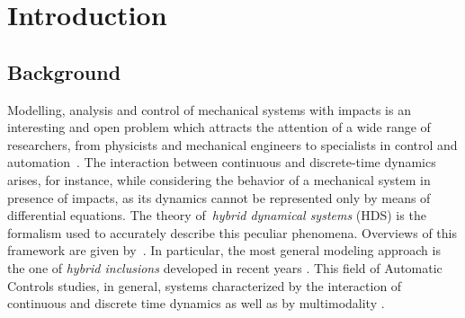 \chapter{{Introduction}}
\label{chap:introduction}
\minitoc

\thispagestyle{empty}

\newpage



\section{Background}

Modelling, analysis and control of mechanical systems with impacts is an interesting and open problem which attracts the attention of a wide range of researchers, from physicists and mechanical engineers to specialists in control and automation~\cite{brogliato1999nonsmooth,stronge2018impact}.
The interaction between continuous and discrete-time dynamics arises, for instance, while considering the behavior of a mechanical system in presence of impacts, as its dynamics cannot be represented only by means of differential equations. The theory of~\textit{hybrid dynamical systems} (HDS) is the formalism used to accurately describe this peculiar phenomena. Overviews of this framework are given by~\cite{van2000introduction,haddad2006impulsive}. In particular, the most general modeling approach is the one of \textit{hybrid inclusions} developed in recent years \cite{goebel2009hybrid}. This field of Automatic Controls studies, in general, systems characterized by the interaction of continuous and discrete time dynamics as well as by multimodality \cite{Goebel2012}.
%
\newline

